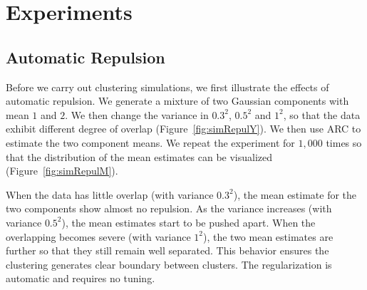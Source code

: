 \documentclass[12pt]{article}
\begin{document}
\section{Experiments}

\subsection{Automatic Repulsion}

Before we carry out clustering simulations, we first illustrate the effects of automatic repulsion. We generate a mixture of two Gaussian components with mean $1$ and $2$. We then change the variance in $0.3^2$, $0.5^2$ and $1^2$, so that the data exhibit different degree of overlap (Figure~\ref{fig:simRepulY}). We then use ARC to estimate the two component means. We repeat the experiment for $1,000$ times so that the distribution of the mean estimates can be visualized  (Figure~\ref{fig:simRepulM}).

 When the data has little overlap (with variance  $0.3^2$), the mean estimate for the two components show almost no repulsion. As the variance increases (with variance  $0.5^2$), the mean estimates start to be pushed apart. When the overlapping becomes severe  (with variance  $1^2$), the two mean estimates are further  so that they still remain well separated. This behavior ensures the clustering generates clear boundary between clusters. The regularization is automatic and requires no tuning.
\end{document}
